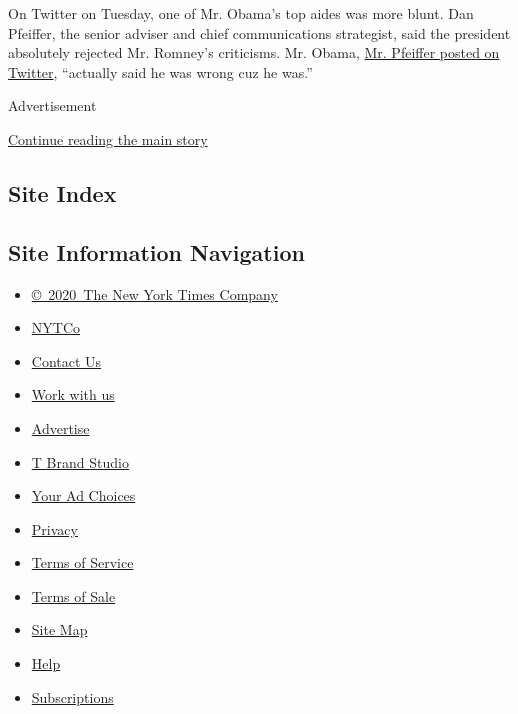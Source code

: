 On Twitter on Tuesday, one of Mr. Obama's top aides was more blunt. Dan
Pfeiffer, the senior adviser and chief communications strategist, said
the president absolutely rejected Mr. Romney's criticisms. Mr. Obama,
\href{https://twitter.com/pfeiffer44/with_replies}{Mr. Pfeiffer posted
on Twitter}, ``actually said he was wrong cuz he was.''

Advertisement

\protect\hyperlink{after-bottom}{Continue reading the main story}

\hypertarget{site-index}{%
\subsection{Site Index}\label{site-index}}

\hypertarget{site-information-navigation}{%
\subsection{Site Information
Navigation}\label{site-information-navigation}}

\begin{itemize}
\tightlist
\item
  \href{https://help.nytimes.com/hc/en-us/articles/115014792127-Copyright-notice}{©~2020~The
  New York Times Company}
\end{itemize}

\begin{itemize}
\tightlist
\item
  \href{https://www.nytco.com/}{NYTCo}
\item
  \href{https://help.nytimes.com/hc/en-us/articles/115015385887-Contact-Us}{Contact
  Us}
\item
  \href{https://www.nytco.com/careers/}{Work with us}
\item
  \href{https://nytmediakit.com/}{Advertise}
\item
  \href{http://www.tbrandstudio.com/}{T Brand Studio}
\item
  \href{https://www.nytimes.com/privacy/cookie-policy\#how-do-i-manage-trackers}{Your
  Ad Choices}
\item
  \href{https://www.nytimes.com/privacy}{Privacy}
\item
  \href{https://help.nytimes.com/hc/en-us/articles/115014893428-Terms-of-service}{Terms
  of Service}
\item
  \href{https://help.nytimes.com/hc/en-us/articles/115014893968-Terms-of-sale}{Terms
  of Sale}
\item
  \href{https://spiderbites.nytimes.com}{Site Map}
\item
  \href{https://help.nytimes.com/hc/en-us}{Help}
\item
  \href{https://www.nytimes.com/subscription?campaignId=37WXW}{Subscriptions}
\end{itemize}
